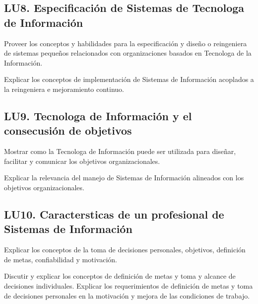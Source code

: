 \subsection{LU8. Especificación de Sistemas de Tecnolog­a de Información}\label{sec:LU8}
\begin{LearningUnit}
\begin{LUGoal}
\item Proveer los conceptos y habilidades para la especificación y diseño o reingenier­a de sistemas pequeños relacionados con organizaciones basados en Tecnolog­a de la Información.
\end{LUGoal}

\begin{LUObjective}
\item Explicar los conceptos de implementación de Sistemas de Información acoplados a la reingenier­a e mejoramiento continuo.
\end{LUObjective}
\end{LearningUnit}

\subsection{LU9. Tecnolog­a de Información y el consecusión de objetivos}\label{sec:LU9}
\begin{LearningUnit}
\begin{LUGoal}
\item Mostrar como la Tecnolog­a de Información puede ser utilizada para diseñar, facilitar y comunicar los objetivos organizacionales.
\end{LUGoal}

\begin{LUObjective}
\item Explicar la relevancia del manejo de Sistemas de Información alineados con los objetivos organizacionales.
\end{LUObjective}
\end{LearningUnit}

\subsection{LU10. Caracter­sticas de un profesional de Sistemas de Información}\label{sec:LU10}
\begin{LearningUnit}
\begin{LUGoal}
\item Explicar los conceptos de la toma de decisiones personales, objetivos, definición de metas, confiabilidad y motivación.
\end{LUGoal}

\begin{LUObjective}
\item Discutir y explicar los conceptos de definición de metas y toma y alcance de decisiones individuales. Explicar los requerimientos de definición de metas y toma de decisiones personales en la motivación y mejora de las condiciones de trabajo.
\end{LUObjective}
\end{LearningUnit}

